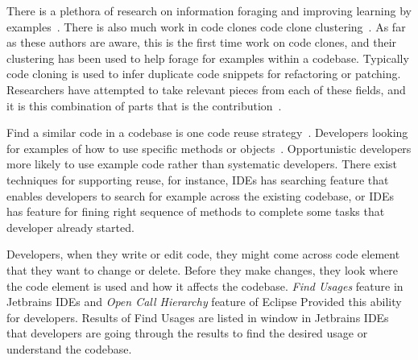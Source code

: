 \documentclass[conference]{IEEEtran}
\begin{document}
There is a plethora of research on information foraging and improving learning by examples~\cite{brandt2009two}. There is also much work in code clones code clone clustering~\cite{codeCloneDetection2019}. As far as these authors are aware, this is the first time work on code clones, and their clustering has been used to help forage for examples within a codebase. Typically code cloning is used to infer duplicate code snippets for refactoring or patching. Researchers have attempted to take relevant pieces from each of these fields, and it is this combination of parts that is the contribution~\cite{kapser2009toward}.\par


Find a similar code in a codebase is one code reuse strategy~\cite{rosson1996reuse}. Developers looking for examples of how to use specific methods or objects~\cite{stylos2006mica,umarji2008archetypal}. Opportunistic developers more likely to use example code rather than systematic developers. There exist techniques for supporting reuse, for instance, IDEs has searching feature that enables developers to search for example across the existing codebase, or IDEs has feature for fining right sequence of methods to complete some tasks that developer already started.\par

Developers, when they write or edit code, they might come across code element that they want to change or delete. Before they make changes, they look where the code element is used and how it affects the codebase. \textit{Find Usages} feature in Jetbrains IDEs and \textit{Open Call Hierarchy} feature of Eclipse Provided this ability for developers. Results of Find Usages are listed in window in Jetbrains IDEs that developers are going through the results to find the desired usage or understand the codebase. 
\par
\end{document}
